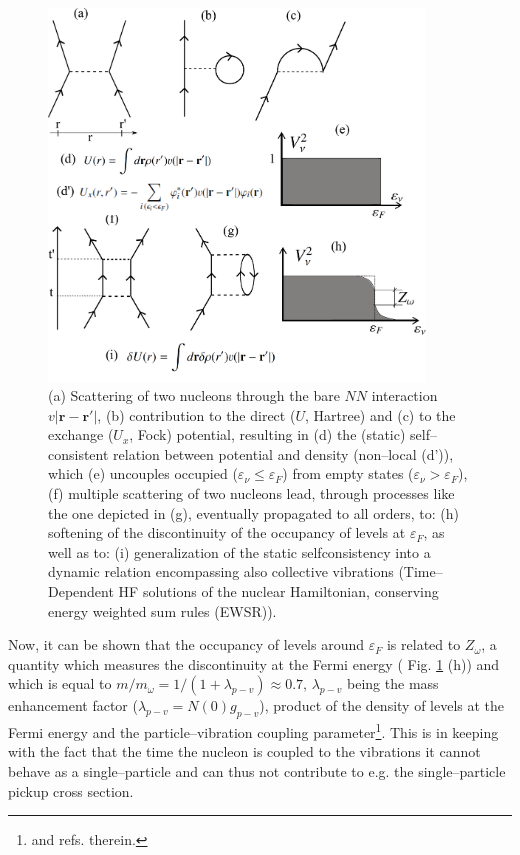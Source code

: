 \begin{subappendices}
 \begin{figure}
\centerline{\includegraphics*[width=10cm,angle=0]{C6/figs_C6/fig6_A1}}
\caption{(a)  Scattering of two nucleons through the bare $NN$ interaction \mbox{$v|\mathbf{r}-\mathbf{r}'|$}, (b) contribution to the direct ($U$, Hartree) and (c) to the exchange ($U_x$, Fock) potential, resulting in (d) the (static) self--consistent relation between potential and density (non--local (d')), which (e) uncouples occupied ($\varepsilon_\nu\leq\varepsilon_F$) from empty states ($\varepsilon_\nu>\varepsilon_F$), (f) multiple scattering of two nucleons lead, through processes like the one depicted in (g), eventually propagated to all orders, to: (h) softening of the discontinuity of the occupancy of levels at $\varepsilon_F$, as well as to: (i) generalization of the static selfconsistency into a dynamic relation encompassing also collective vibrations (Time--Dependent HF solutions of the nuclear Hamiltonian, conserving energy weighted sum rules (EWSR)).}\label{fig6_A1}
\end{figure}

Now, it can be shown that the occupancy of levels around $\varepsilon_F$ is related to $Z_\omega$, a quantity which measures the discontinuity at the Fermi energy ( Fig. \ref{fig6_A1} (h)) and which is equal to $m/m_\omega=1/(1+\lambda_{p-v})\approx 0.7,\, \lambda_{p-v}$ being the mass enhancement factor ($\lambda_{p-v}=N(0)g_{p-v}$), product of the density of levels at the Fermi energy and the particle--vibration coupling parameter\footnote{\cite{Barranco:05,Brink:05} and refs. therein.}. This is in keeping with the fact that the time the nucleon is coupled to the vibrations it cannot behave as a single--particle and can thus not contribute to e.g. the single--particle pickup cross section.



















\end{subappendices}
